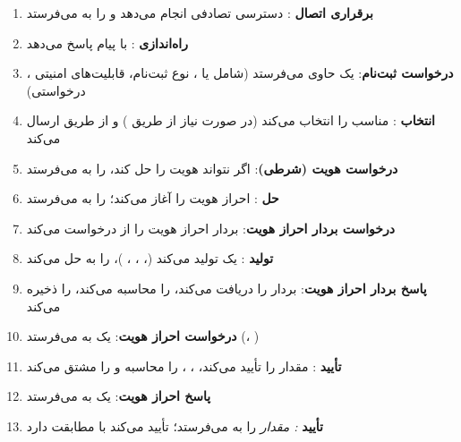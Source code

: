 \begin{enumerate}
\def\labelenumi{\arabic{enumi}.}
\tightlist
\item
  \textbf{برقراری اتصال }:  دسترسی تصادفی انجام می‌دهد و  را به  می‌فرستد
\item
  \textbf{راه‌اندازی }:  با پیام  پاسخ می‌دهد
\item
  \textbf{درخواست ثبت‌نام}:  یک  حاوی  می‌فرستد (شامل  یا ، نوع ثبت‌نام، قابلیت‌های امنیتی ،  درخواستی)
\item
  \textbf{انتخاب }:  مناسب را انتخاب می‌کند (در صورت نیاز از طریق ) و از طریق  ارسال می‌کند
\item
  \textbf{درخواست هویت (شرطی)}: اگر  نتواند هویت را حل کند،  را به  می‌فرستد
\item
  \textbf{حل }:  احراز هویت را آغاز می‌کند؛  را به  می‌فرستد
\item
  \textbf{درخواست بردار احراز هویت}:  بردار احراز هویت را از  درخواست می‌کند
\item
  \textbf{تولید }:  یک  تولید می‌کند (، ، ، )،  را به  حل می‌کند
\item
  \textbf{پاسخ بردار احراز هویت}:  بردار را دریافت می‌کند،  را محاسبه می‌کند،  را ذخیره می‌کند
\item
  \textbf{درخواست احراز هویت}:  یک  به  می‌فرستد (، )
\item
  \textbf{تأیید }:  مقدار  را تأیید می‌کند، ، ،  را محاسبه و  را مشتق می‌کند
\item
  \textbf{پاسخ احراز هویت}:  یک  به  می‌فرستد
\item
  \textbf{تأیید }\emph{:  مقدار } را به  می‌فرستد؛  تأیید می‌کند  با  مطابقت دارد

\end{enumerate}
